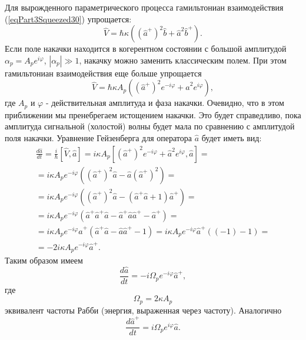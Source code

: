 Для вырожденного параметрического процесса гамильтониан взаимодействия
(\ref{eqPart3Squeezed30}) упрощается:
\begin{equation}
\hat{V} = \hbar \kappa \left(
\left(\hat{a}^{+}\right)^2 \hat{b} + 
\hat{a}^2 \hat{b}^{+}
\right).
\nonumber
\end{equation}
Если поле накачки находится в когерентном состоянии с большой
амплитудой $\alpha_p = A_p e^{i \varphi}$, $\left|\alpha_p\right| \gg
1$, накачку можно заменить классическим полем. При этом гамильтониан
взаимодействия еще больше упрощается
\begin{equation}
\hat{V} = \hbar \kappa A_p\left(
\left(\hat{a}^{+}\right)^2 e^{- i \varphi} + 
\hat{a}^2 e^{i \varphi}
\right),
\nonumber
\end{equation}
где $A_p$ и $\varphi$ - действительная амплитуда и фаза
накачки. Очевидно, что в этом приближении мы пренебрегаем истощением
накачки. Это будет справедливо, пока амплитуда сигнальной (холостой)
волны будет мала по сравнению с амплитудой поля накачки. Уравнение
Гейзенберга для оператора $\hat{a}$ будет иметь вид:
\begin{eqnarray}
\frac{d\hat{a}}{dt} = \frac{i}{\hbar}
\left[\hat{V}, \hat{a}\right] = i \kappa A_p
\left[
\left(\hat{a}^{+}\right)^2 e^{- i \varphi} + 
\hat{a}^2 e^{i \varphi},
\hat{a}
\right] = 
\nonumber \\
=
i \kappa A_p e^{- i \varphi}
\left(
\left(
\hat{a}^{+}\right)^2  \hat{a} -
\hat{a}
\left(
\hat{a}^{+}\right)^2
\right) = 
\nonumber \\
=
i \kappa A_p e^{- i \varphi}
\left(
\left(
\hat{a}^{+}\right)^2  \hat{a} -
\left(\hat{a}^{+}\hat{a} + 1\right)
\hat{a}^{+}
\right) = 
\nonumber \\
=
i \kappa A_p e^{- i \varphi}
\left(
\hat{a}^{+}\hat{a}^{+}  \hat{a} -
\hat{a}^{+}\hat{a}\hat{a}^{+} -
\hat{a}^{+}
\right) = 
\nonumber \\
=
i \kappa A_p e^{- i \varphi}
\hat{a}^{+}
\left(
\hat{a}^{+}  \hat{a} -
\hat{a}\hat{a}^{+} -
1
\right) = 
i \kappa A_p e^{- i \varphi}
\hat{a}^{+}
\left(
\left(-1\right) -
1
\right) =
\nonumber \\
= 
- 2 i \kappa A_p e^{- i \varphi}
\hat{a}^{+}.
\nonumber
\end{eqnarray}
Таким образом имеем
\begin{equation}
\frac{d\hat{a}}{dt} = 
- i \Omega_p e^{- i \varphi}
\hat{a}^{+},
\label{eqPart3Squeezed34a}
\end{equation}
где 
\[
\Omega_p = 2 \kappa A_p
\]
эквивалент частоты Рабби (энергия, выраженная через частоту).
Аналогично
\begin{equation}
\frac{d\hat{a}^{+}}{dt} = 
i \Omega_p e^{i \varphi}
\hat{a}.
\label{eqPart3Squeezed34b}
\end{equation}

